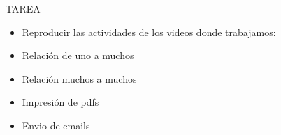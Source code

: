 TAREA
\begin{itemize}		
	\item Reproducir las actividades de los videos donde trabajamos:
	\item Relación de uno a muchos
        \item Relación muchos a muchos
        \item Impresión de pdfs 
        \item Envio de emails
\end{itemize}
